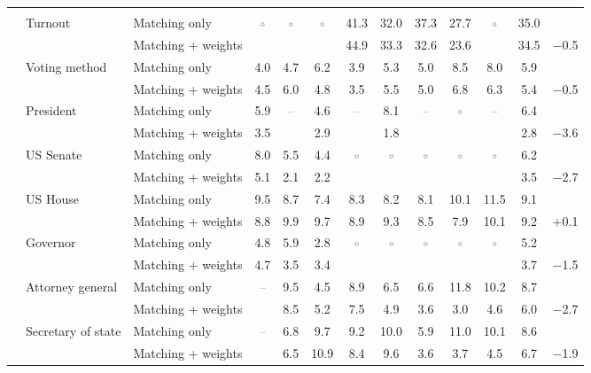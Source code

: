 \begin{table}[!htbp]
{\begin{threeparttable}
\begin{tabular}{llcccccccccc}
\addlinespace[0.3em]
\multicolumn{12}{l}{Non-demographic} \\
\addlinespace[0.1em]
~~Turnout & Matching only & \textcolor{gray}{$\circ$} & \textcolor{gray}{$\circ$} & \textcolor{gray}{$\circ$} & 41.3 & 32.0 & 37.3 & 27.7 & \textcolor{gray}{$\circ$} & 35.0 & \\
 & Matching + weights &  &  &  & 44.9 & 33.3 & 32.6 & 23.6 &  & 34.5 & $-$0.5 \\
\addlinespace[0.1em]
~~Voting method & Matching only & 4.0 & 4.7 & 6.2 & 3.9 & 5.3 & 5.0 & 8.5 & 8.0 & 5.9 & \\
 & Matching + weights & 4.5 & 6.0 & 4.8 & 3.5 & 5.5 & 5.0 & 6.8 & 6.3 & 5.4 & $-$0.5 \\
\addlinespace[0.1em]
~~President & Matching only & 5.9 & \textcolor{gray}{--} & 4.6 & \textcolor{gray}{--} & 8.1 & \textcolor{gray}{--} & \textcolor{gray}{$\circ$} & \textcolor{gray}{--} & 6.4 & \\
 & Matching + weights & 3.5 &  & 2.9 &  & 1.8 &  &  &  & 2.8 & $-$3.6 \\
\addlinespace[0.1em]
~~US Senate & Matching only & 8.0 & 5.5 & 4.4 & \textcolor{gray}{$\circ$} & \textcolor{gray}{$\circ$} & \textcolor{gray}{$\circ$} & \textcolor{gray}{$\circ$} & \textcolor{gray}{$\circ$} & 6.2 & \\
 & Matching + weights & 5.1 & 2.1 & 2.2 &  &  &  &  &  & 3.5 & $-$2.7 \\
\addlinespace[0.1em]
~~US House & Matching only & 9.5 & 8.7 & 7.4 & 8.3 & 8.2 & 8.1 & 10.1 & 11.5 & 9.1 & \\
 & Matching + weights & 8.8 & 9.9 & 9.7 & 8.9 & 9.3 & 8.5 & 7.9 & 10.1 & 9.2 & +0.1 \\
\addlinespace[0.1em]
~~Governor & Matching only & 4.8 & 5.9 & 2.8 & \textcolor{gray}{$\circ$} & \textcolor{gray}{$\circ$} & \textcolor{gray}{$\circ$} & \textcolor{gray}{$\circ$} & \textcolor{gray}{$\circ$} & 5.2 & \\
 & Matching + weights & 4.7 & 3.5 & 3.4 &  &  &  &  &  & 3.7 & $-$1.5 \\
\addlinespace[0.1em]
~~Attorney general & Matching only & \textcolor{gray}{--} & 9.5 & 4.5 & 8.9 & 6.5 & 6.6 & 11.8 & 10.2 & 8.7 & \\
 & Matching + weights &  & 8.5 & 5.2 & 7.5 & 4.9 & 3.6 & 3.0 & 4.6 & 6.0 & $-$2.7 \\
\addlinespace[0.1em]
~~Secretary of state & Matching only & \textcolor{gray}{--} & 6.8 & 9.7 & 9.2 & 10.0 & 5.9 & 11.0 & 10.1 & 8.6 & \\
 & Matching + weights &  & 6.5 & 10.9 & 8.4 & 9.6 & 3.6 & 3.7 & 4.5 & 6.7 & $-$1.9 \\

\end{tabular}
\end{threeparttable}}
\end{table}
